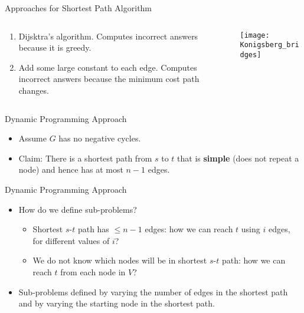    \begin{frame}[fragile]{Approaches for Shortest Path Algorithm}

  \begin{columns}
    \begin{column}{0.5\textwidth}
      \begin{enumerate}
      \item Dijsktra's algorithm. {Computes incorrect
          answers because it is greedy.}
      \item Add some large constant to each edge.
        {Computes incorrect answers because the minimum
          cost path changes.}
      \end{enumerate}
    \end{column}
    
    \begin{column}{0.5\textwidth}
      {
 \begin{center}
\texttt{[image: Konigsberg\_bridges]}
\end{center}
      }
    \end{column}
  \end{columns}
\end{frame}



   \begin{frame}[fragile]{Dynamic Programming Approach}

  \begin{itemize}
  \item Assume $G$ has no negative cycles.
  \item Claim: There is a shortest path from $s$ to $t$ that is
    \textbf{simple} (does not repeat a node)   and hence has at most $n -
    1$ edges.  
  \end{itemize}

\end{frame}


   \begin{frame}[fragile]{Dynamic Programming Approach}

      \begin{itemize}
      \item How do we define sub-problems?  

        \begin{itemize}
        \item Shortest $s$-$t$ path has $\leq n - 1$ edges: how we can
          reach $t$ using $i$ edges, for different values of $i$?
        \item We do not know which nodes will be in shortest
          $s$-$t$ path: how we can reach $t$ from each
          node in $V$? 
        \end{itemize}
      \item Sub-problems defined by varying the number of edges in the
        shortest path and by varying the starting node in the shortest
        path.
      \end{itemize}

\end{frame}


